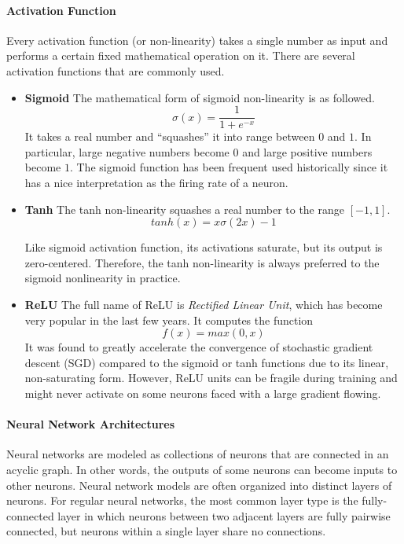\documentclass[10pt,twocolumn,letterpaper]{article}
\begin{document}
\paragraph{Activation Function}
	Every activation function (or non-linearity) takes a single number as input and performs a certain fixed mathematical operation on it. There are several activation functions that are commonly used.
\begin{itemize}
\item \textbf{Sigmoid} The mathematical form of sigmoid non-linearity is as followed.
\begin{equation}
	\sigma(x) = \frac{1}{1 + e^{-x}}
\end{equation}
	It takes a real number and ``squashes'' it into range between $0$ and $1$. In particular, large negative numbers become $0$ and large positive numbers become $1$. The sigmoid function has been frequent used historically since it has a nice interpretation as the firing rate of a neuron. 

\item \textbf{Tanh} The tanh non-linearity squashes a real number to the range $[-1, 1]$. 
\begin{equation}
	tanh(x) = x \sigma (2x) - 1
\end{equation}

	Like sigmoid activation function, its activations saturate, but its output is zero-centered. Therefore, the tanh non-linearity is always preferred to the sigmoid nonlinearity in practice.

\item \textbf{ReLU}\cite{relu} The full name of ReLU is \textit{Rectified Linear Unit}, which has become very popular in the last few years. It computes the function 
\begin{equation}
	f(x) = max(0, x)
\end{equation}
	It was found to greatly accelerate the convergence of stochastic gradient descent (SGD) compared to the sigmoid or tanh functions due to its linear, non-saturating form. However, ReLU units can be fragile during training and might never activate on some neurons faced with a large gradient flowing.
\end{itemize}

\paragraph{Neural Network Architectures}
	Neural networks are modeled as collections of neurons that are connected in an acyclic graph. In other words, the outputs of some neurons can become inputs to other neurons. Neural network models are often organized into distinct layers of neurons. For regular neural networks, the most common layer type is the fully-connected layer in which neurons between two adjacent layers are fully pairwise connected, but neurons within a single layer share no connections. 
	
\end{document}
